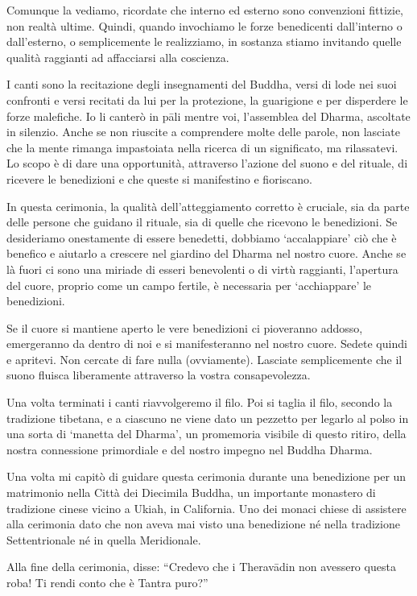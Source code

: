 Comunque la vediamo, ricordate che interno ed esterno sono convenzioni fittizie, non realtà ultime. Quindi, quando invochiamo le forze benedicenti dall'interno o dall'esterno, o semplicemente le realizziamo, in sostanza stiamo invitando quelle qualità raggianti ad affacciarsi alla coscienza.

I canti sono la recitazione degli insegnamenti del Buddha, versi di lode nei suoi confronti e versi recitati da lui per la protezione, la guarigione e per disperdere le forze malefiche. Io li canterò in pāli mentre voi, l'assemblea del Dharma, ascoltate in silenzio. Anche se non riuscite a comprendere molte delle parole, non lasciate che la mente rimanga impastoiata nella ricerca di un significato, ma rilassatevi. Lo scopo è di dare una opportunità, attraverso l'azione del suono e del rituale, di ricevere le benedizioni e che queste si manifestino e fioriscano.

In questa cerimonia, la qualità dell'atteggiamento corretto è cruciale, sia da parte delle persone che guidano il rituale, sia di quelle che ricevono le benedizioni. Se desideriamo onestamente di essere benedetti, dobbiamo `accalappiare' ciò che è benefico e aiutarlo a crescere nel giardino del Dharma nel nostro cuore. Anche se là fuori ci sono una miriade di esseri benevolenti o di virtù raggianti, l'apertura del cuore, proprio come un campo fertile, è necessaria per `acchiappare' le benedizioni.

Se il cuore si mantiene aperto le vere benedizioni ci pioveranno addosso, emergeranno da dentro di noi e si manifesteranno nel nostro cuore. Sedete quindi e apritevi. Non cercate di fare nulla (ovviamente). Lasciate semplicemente che il suono fluisca liberamente attraverso la vostra consapevolezza.

Una volta terminati i canti riavvolgeremo il filo. Poi si taglia il filo, secondo la tradizione tibetana, e a ciascuno ne viene dato un pezzetto per legarlo al polso in una sorta di `manetta del Dharma', un promemoria visibile di questo ritiro, della nostra connessione primordiale e del nostro impegno nel Buddha Dharma.

Una volta mi capitò di guidare questa cerimonia durante una benedizione per un matrimonio nella Città dei Diecimila Buddha, un importante monastero di tradizione cinese vicino a Ukiah, in California. Uno dei monaci chiese di assistere alla cerimonia dato che non aveva mai visto una benedizione né nella tradizione Settentrionale né in quella Meridionale.

Alla fine della cerimonia, disse: ``Credevo che i Theravādin non avessero questa roba! Ti rendi conto che è Tantra puro?''

